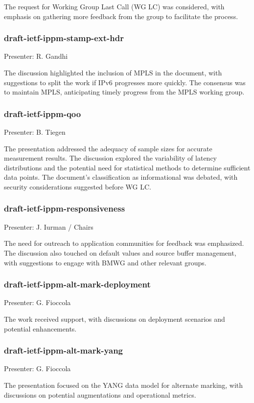 \documentclass{article}
\begin{document}
The request for Working Group Last Call (WG LC) was considered, with emphasis on gathering more feedback from the group to facilitate the process.

\subsubsection{draft-ietf-ippm-stamp-ext-hdr}
Presenter: R. Gandhi

The discussion highlighted the inclusion of MPLS in the document, with suggestions to split the work if IPv6 progresses more quickly. The consensus was to maintain MPLS, anticipating timely progress from the MPLS working group.

\subsubsection{draft-ietf-ippm-qoo}
Presenter: B. Tiegen

The presentation addressed the adequacy of sample sizes for accurate measurement results. The discussion explored the variability of latency distributions and the potential need for statistical methods to determine sufficient data points. The document's classification as informational was debated, with security considerations suggested before WG LC.

\subsubsection{draft-ietf-ippm-responsiveness}
Presenter: J. Iurman / Chairs

The need for outreach to application communities for feedback was emphasized. The discussion also touched on default values and source buffer management, with suggestions to engage with BMWG and other relevant groups.

\subsubsection{draft-ietf-ippm-alt-mark-deployment}
Presenter: G. Fioccola

The work received support, with discussions on deployment scenarios and potential enhancements.

\subsubsection{draft-ietf-ippm-alt-mark-yang}
Presenter: G. Fioccola

The presentation focused on the YANG data model for alternate marking, with discussions on potential augmentations and operational metrics.
\end{document}
